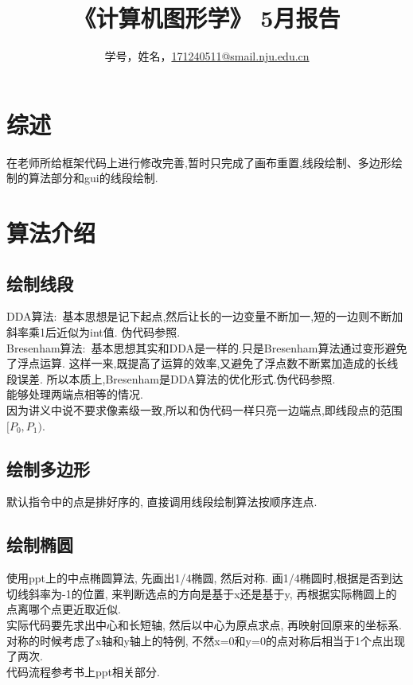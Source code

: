 \documentclass[a4paper,UTF8]{article}
\theoremstyle{definition}
\begin{document}
\title{\textbf{《计算机图形学》 5月报告 }}
\author{学号，姓名，\href{mailto:xxx@xxx.com}{171240511@smail.nju.edu.cn}}
\maketitle

\section{综述}
在老师所给框架代码上进行修改完善,暂时只完成了画布重置,线段绘制、多边形绘制的算法部分和gui的线段绘制.

\section{算法介绍}
\subsection{绘制线段}
\indent DDA算法:\ 基本思想是记下起点,然后让长的一边变量不断加一,短的一边则不断加斜率乘1后近似为int值.
伪代码参照\cite{rog_2002}.\\

\indent Bresenham算法:\ 基本思想其实和DDA是一样的.只是Bresenham算法通过变形避免了浮点运算.
这样一来,既提高了运算的效率,又避免了浮点数不断累加造成的长线段误差.
所以本质上,Bresenham是DDA算法的优化形式.伪代码参照\cite{rog_2002}.\\

\indent 能够处理两端点相等的情况.\\
\indent 因为讲义中说不要求像素级一致,所以和伪代码一样只亮一边端点,即线段点的范围$[P_0,P_1)$.\\

\subsection{绘制多边形}
默认指令中的点是排好序的, 直接调用线段绘制算法按顺序连点.\\

\subsection{绘制椭圆}
\indent 使用ppt上的中点椭圆算法, 先画出1/4椭圆, 然后对称. 画1/4椭圆时,根据是否到达切线斜率为-1的位置, 来判断选点的方向是基于x还是基于y, 再根据实际椭圆上的点离哪个点更近取近似.\\
\indent 实际代码要先求出中心和长短轴, 然后以中心为原点求点, 再映射回原来的坐标系.\\
\indent 对称的时候考虑了x轴和y轴上的特例, 不然x=0和y=0的点对称后相当于1个点出现了两次.\\
\indent 代码流程参考书上ppt相关部分.\\
\end{document}
